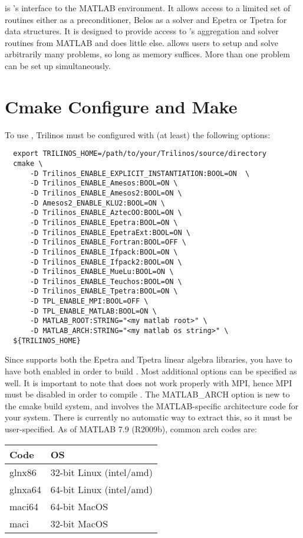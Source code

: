 \muemex is \muelu's interface to the MATLAB environment. It allows access
to a limited set of routines either \muelu as a preconditioner,
Belos as a solver and Epetra or Tpetra for data structures.
It is designed to provide access to \muelu's aggregation and
solver routines from MATLAB and does little else. \muemex allows users to
setup and solve arbitrarily many problems, so long as memory suffices.
More than one problem can be set up simultaneously.

\section{Cmake Configure and Make}\label{sec:muemex:cmake}
To use \muemex, Trilinos must be configured with (at least) the
following options:

\begin{lstlisting}
  export TRILINOS_HOME=/path/to/your/Trilinos/source/directory
  cmake \
      -D Trilinos_ENABLE_EXPLICIT_INSTANTIATION:BOOL=ON  \
      -D Trilinos_ENABLE_Amesos:BOOL=ON \
      -D Trilinos_ENABLE_Amesos2:BOOL=ON \
      -D Amesos2_ENABLE_KLU2:BOOL=ON \
      -D Trilinos_ENABLE_AztecOO:BOOL=ON \
      -D Trilinos_ENABLE_Epetra:BOOL=ON \
      -D Trilinos_ENABLE_EpetraExt:BOOL=ON \
      -D Trilinos_ENABLE_Fortran:BOOL=OFF \
      -D Trilinos_ENABLE_Ifpack:BOOL=ON \
      -D Trilinos_ENABLE_Ifpack2:BOOL=ON \
      -D Trilinos_ENABLE_MueLu:BOOL=ON \
      -D Trilinos_ENABLE_Teuchos:BOOL=ON \
      -D Trilinos_ENABLE_Tpetra:BOOL=ON \
      -D TPL_ENABLE_MPI:BOOL=OFF \
      -D TPL_ENABLE_MATLAB:BOOL=ON \
      -D MATLAB_ROOT:STRING="<my matlab root>" \
      -D MATLAB_ARCH:STRING="<my matlab os string>" \
  ${TRILINOS_HOME}
\end{lstlisting}

Since \muemex supports both the Epetra and Tpetra linear algebra
libraries, you have to have both enabled in order to build \muemex.
Most additional options can be specified as well.  It is important to
note that \muemex does not work properly with MPI, hence MPI must be
disabled in order to compile \muemex.  The MATLAB\_ARCH option is new to
the cmake build system, and involves the MATLAB-specific architecture
code for your system.  There is currently no automatic way to extract
this, so it must be user-specified.  As of MATLAB 7.9 (R2009b), common
arch codes are:
\begin{center}
\begin{tabular}{l|l}
Code& OS\\
\hline
glnx86& 32-bit Linux (intel/amd)\\
glnxa64& 64-bit Linux (intel/amd)\\
maci64& 64-bit MacOS\\
maci& 32-bit MacOS\\
\end{tabular}
\end{center}

